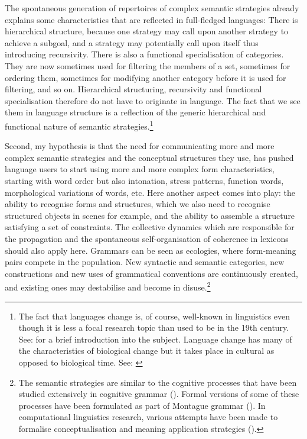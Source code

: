 The spontaneous generation of repertoires of complex 
semantic strategies already explains some characteristics 
that are reflected in full-fledged languages: 
There is hierarchical structure, because one strategy 
may call upon another strategy to achieve a subgoal, 
and a strategy may potentially call upon itself thus introducing 
recursivity. There is also a functional specialisation
of categories. They are now sometimes used for filtering
the members of a set, sometimes for ordering them, sometimes
for modifying another category before it is used for 
filtering, and so on. Hierarchical structuring, recursivity
and functional specialisation therefore do not have to 
originate in language. The fact that we see them in 
language structure is a reflection of the generic 
hierarchical and functional nature 
of semantic strategies.\footnote{
The fact that languages change is, of course, 
well-known in linguistics even though it is less a focal 
research topic than used to be in the 19th century. 
See: \cite{McMahon:1994} for a brief introduction into the 
subject. Language change has many of the characteristics
of biological change but it takes place in cultural 
as opposed to biological time. See: \cite{Labov:1994}}

Second, my hypothesis is that the need for communicating 
more and more complex semantic strategies and the 
conceptual structures they use, has pushed language 
users to start using more and more complex form characteristics, 
starting with word order but also intonation, stress 
patterns, function words, morphological variations of words, 
etc. Here another aspect comes into 
play: the ability to recognise forms and structures, 
which we also need to recognise structured objects in 
scenes for example, and the ability to assemble a 
structure satisfying a set of constraints. The collective
dynamics which are responsible for the propagation and the spontaneous 
self-organisation of coherence in lexicons should also apply  
here. Grammars can be seen as ecologies, where
form-meaning pairs compete in the population. New 
syntactic and semantic categories, new constructions and 
new uses of grammatical conventions are continuously created,
and existing ones may destabilise and become
in disuse.\footnote{
The semantic strategies are similar to the 
cognitive processes that have been studied extensively 
in cognitive grammar (\cite{Langacker:1987}). Formal versions
of some of these processes have been formulated as 
part of Montague grammar (\cite{Montague:1974}). In 
computational linguistics research, various 
attempts have been made to formalise conceptualisation
and meaning application strategies (\cite{Gazdar:1989}).}

